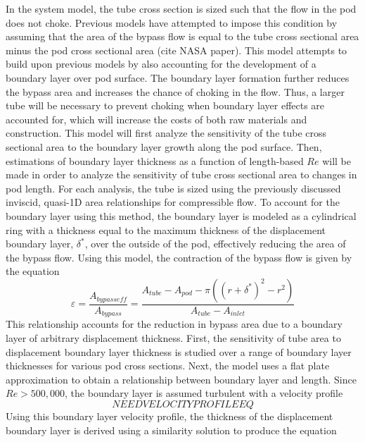 In the system model, the tube cross section is sized such that the flow in the pod does not choke.
Previous models have attempted to impose this condition by assuming that the
area of the bypass flow is equal to the tube cross sectional area minus the
pod cross sectional area (cite NASA paper). This model attempts to build upon
previous models by also accounting for the development of a boundary layer over pod surface.
The boundary layer formation further reduces the bypass area and increases the
chance of choking in the flow. Thus, a larger tube will be necessary to prevent
choking when boundary layer effects are accounted for, which will increase the
costs of both raw materials and construction. This model will first analyze the
sensitivity of the tube cross sectional area to the boundary layer growth along
the pod surface. Then, estimations of boundary layer thickness as a function of
length-based $Re$ will be made in order to analyze the sensitivity of tube
cross sectional area to changes in pod length.
For each analysis, the tube is sized using the previously discussed inviscid,
quasi-1D area relationships for compressible flow. To account for the boundary
layer using this method, the boundary layer is modeled as a cylindrical ring
with a thickness equal to the maximum thickness of the displacement boundary layer,
$\delta^{*}$, over the outside of the pod, effectively reducing the area of the bypass flow.
Using this model, the contraction of the bypass flow is given by the equation
\begin{equation}
	\label{eq:epsilon}
	\varepsilon  = \frac{A_{bypass eff}}{A_{bypass}} = \frac{A_{tube}-A_{pod} -\pi  (  ( r+\delta ^{*}  )^{2}-r^{2}  )}{A_{tube}-A_{inlet}}
\end{equation}
This relationship accounts for the reduction in bypass area due to a boundary
layer of arbitrary displacement thickness. First, the sensitivity of tube area
to displacement boundary layer thickness is studied over a range of boundary
layer thicknesses for various pod cross sections. Next, the model uses a flat
plate approximation to obtain a relationship between boundary layer and length.
Since $Re > 500,000$, the boundary layer is assumed turbulent with a velocity profile \cite{FoxMcDonald}
\begin{equation}
	\label{eq:boundary_layer_profile}
	NEED VELOCITY PROFILE EQ
\end{equation}
Using this boundary layer velocity profile, the thickness of the displacement
boundary layer is derived using a similarity solution to produce the equation \cite{FoxMcDonald}
